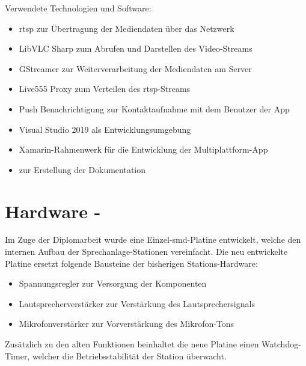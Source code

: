 Verwendete Technologien und Software:
\begin{itemize}
    \item \ac{rtsp} zur Übertragung der Mediendaten über das Netzwerk
    \item LibVLC Sharp zum Abrufen und Darstellen des Video-Streams
    \item GStreamer zur Weiterverarbeitung der Mediendaten am Server
    \item Live555 Proxy zum Verteilen des \ac{rtsp}-Streams
    \item Push Benachrichtigung zur Kontaktaufnahme mit dem Benutzer der App
    \item Visual Studio 2019 als Entwicklungsumgebung
    \item Xamarin-Rahmenwerk für die Entwicklung der Multiplattform-App
    \item {} zur Erstellung der Dokumentation
\end{itemize}

\section{Hardware - \MatthiasMair}
Im Zuge der Diplomarbeit wurde eine Einzel-\ac{smd}-Platine entwickelt, welche den internen Aufbau der Sprechanlage-Stationen vereinfacht.
Die neu entwickelte Platine ersetzt folgende Bausteine der bisherigen Stations-Hardware:
\begin{itemize}
    \item Spannungsregler zur Versorgung der Komponenten
    \item Lautsprecherverstärker zur Verstärkung des Lautsprechersignals
    \item Mikrofonverstärker zur Vorverstärkung des Mikrofon-Tons
\end{itemize}
Zusätzlich zu den alten Funktionen beinhaltet die neue Platine einen Watchdog-Timer, welcher die Betriebsstabilität der Station überwacht.

